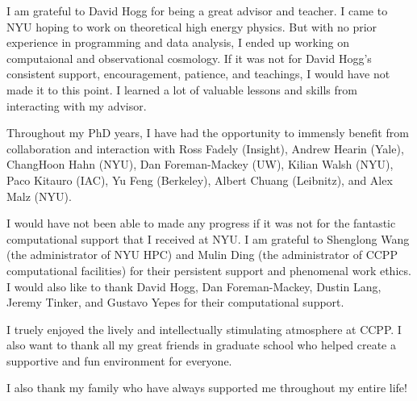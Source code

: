 I am grateful to David Hogg for being a great advisor and teacher. 
I came to NYU hoping to work on theoretical high energy physics.
But with no prior experience in programming and data analysis, I ended up working on 
computaional and observational cosmology. If it was not for David Hogg's consistent support, 
encouragement, patience, and teachings, I would have not made it to 
this point. I learned a lot of valuable lessons and skills from interacting with 
my advisor.

Throughout my PhD years, I have had the opportunity to immensly benefit from collaboration and 
interaction with Ross Fadely (Insight), Andrew Hearin (Yale), ChangHoon Hahn (NYU), 
Dan Foreman-Mackey (UW), Kilian Walsh (NYU), Paco Kitauro (IAC), Yu Feng (Berkeley), 
Albert Chuang (Leibnitz), and Alex Malz (NYU).

I would have not been able to made any progress if it was not for the 
fantastic computational support that I received at NYU. I am grateful to 
Shenglong Wang (the administrator of NYU HPC) and Mulin Ding (the administrator 
of CCPP computational facilities) for their persistent support and 
phenomenal work ethics. I would also like to thank David Hogg, Dan Foreman-Mackey, 
Dustin Lang, Jeremy Tinker, and Gustavo Yepes for their computational support. 

I truely enjoyed the lively and intellectually stimulating atmosphere at CCPP.
I also want to thank all my great friends in graduate school who helped create a 
supportive and fun environment for everyone.  

I also thank my family who have always supported me throughout my entire life! 


